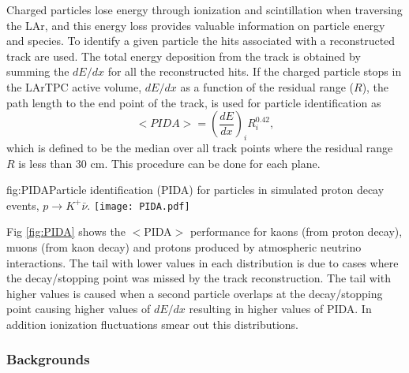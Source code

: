 Charged particles lose energy through ionization and scintillation when traversing the LAr, and this energy loss provides valuable information on particle energy and species. To identify a given particle the hits associated with a reconstructed track are used.
The total energy deposition from the track is obtained by summing the $dE/dx$ for all the reconstructed hits. If the charged particle stops in the LArTPC active volume, $dE/dx$ as a function of the residual range ($R$), the path length to the end point of the track, is used for particle identification as
\begin{equation}
<PIDA >= \left(\frac{dE}{dx}\right)_{i}R^{0.42}_{i}, 
\end{equation}
which is defined to be the median over all track points where the residual range $R$ is less than 30 cm. This procedure can be done for each plane. 

\begin{dunefigure}{fig:PIDA}{Particle identification (PIDA) for particles in simulated proton decay events, $p\rightarrow K^{+} \bar{\nu}$.}
\texttt{[image: PIDA.pdf]}
\end{dunefigure}

Fig \ref{fig:PIDA} shows the $<$PIDA$>$ performance for kaons (from proton decay), muons (from kaon decay) and protons produced by atmospheric neutrino interactions. The tail with lower values in each distribution is due to cases where the decay/stopping point was missed by the track reconstruction. The tail with higher values is caused when a second particle overlaps at the decay/stopping point causing higher values of $dE/dx$ resulting in higher values of PIDA. In addition ionization fluctuations smear out this distributions.

\subsubsection{Backgrounds}
\label{sec:ndkbkgd}

